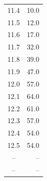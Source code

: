 \begin{table}
\begin{tabular}{S S}
    11.4 & 10.0 \\
    11.5 & 12.0 \\
    11.6 & 17.0 \\
    11.7 & 32.0 \\
    11.8 & 39.0 \\
    11.9 & 47.0 \\
    12.0 & 57.0 \\
    12.1 & 64.0 \\
    12.2 & 61.0 \\
    12.3 & 57.0 \\
    12.4 & 54.0 \\
    12.5 & 54.0 \\
    \---  & \,\,\,\,\,\,\,\,\--- \\
    \---  & \,\,\,\,\,\,\,\,\--- \\
    \bottomrule
    \end{tabular}
    \label{tab:brrb}
\end{table}

